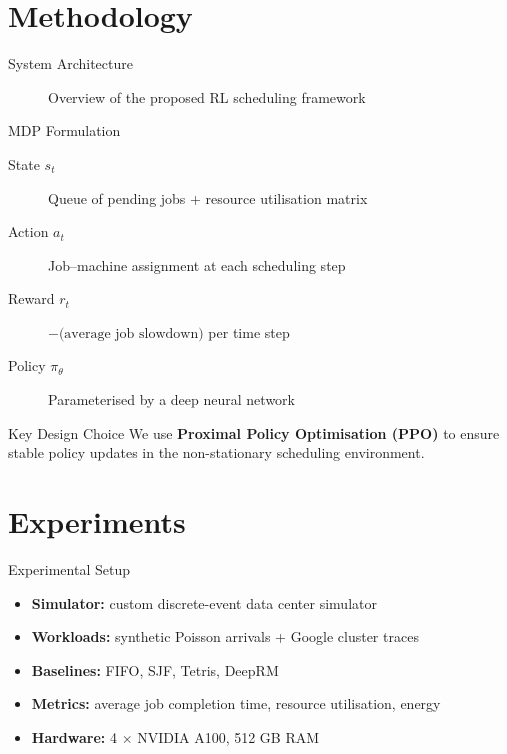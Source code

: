 \documentclass[aspectratio=169]{beamer}  %
\begin{document}
\section{Methodology}

\begin{frame}{System Architecture}
  \begin{figure}
    \centering
    \fbox{\rule{0pt}{4cm}\rule{10cm}{0pt}}  %
    \caption{Overview of the proposed RL scheduling framework}
  \end{figure}
\end{frame}

\begin{frame}{MDP Formulation}
  \begin{description}
    \item[State $s_t$] Queue of pending jobs + resource utilisation matrix
    \item[Action $a_t$] Job–machine assignment at each scheduling step
    \item[Reward $r_t$] $-\text{(average job slowdown)}$ per time step
    \item[Policy $\pi_\theta$] Parameterised by a deep neural network
  \end{description}

  \vspace{0.5em}
  \begin{alertblock}{Key Design Choice}
    We use \textbf{Proximal Policy Optimisation (PPO)} to ensure
    stable policy updates in the non-stationary scheduling environment.
  \end{alertblock}
\end{frame}

\section{Experiments}

\begin{frame}{Experimental Setup}
  \begin{itemize}
    \item \textbf{Simulator:} custom discrete-event data center simulator
    \item \textbf{Workloads:} synthetic Poisson arrivals + Google cluster traces
    \item \textbf{Baselines:} FIFO, SJF, Tetris, DeepRM
    \item \textbf{Metrics:} average job completion time, resource utilisation, energy
    \item \textbf{Hardware:} 4 $\times$ NVIDIA A100, 512 GB RAM
  \end{itemize}
\end{frame}
\end{document}
